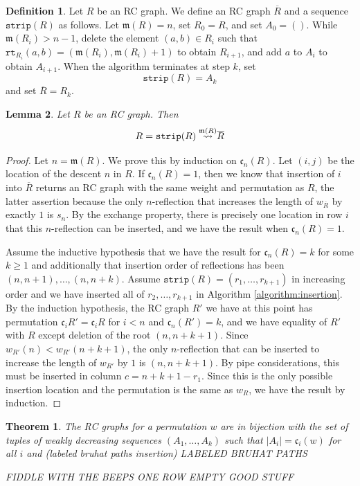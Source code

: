 \documentclass{amsart}
\newtheorem{lemma}{Lemma}[subsection]
\newtheorem{theorem}{Theorem}[section]
\theoremstyle{definition}
\newtheorem{definition}[lemma]{Definition}
\theoremstyle{remark}
\numberwithin{equation}{subsection}
\newcommand{\wof}[1]{w_{#1}}
\newcommand{\rtt}{\mathtt{rt}}
\newcommand{\code}{\mathfrak{c}}
\newcommand{\maxd}{\mathfrak{m}}
\begin{document}
\begin{definition}
Let $R$ be an RC graph. We define an RC graph $\overline{R}$ and a sequence $\mathtt{strip}(R)$ as follows. Let $\maxd(R)=n$, set $R_0=R$, and set $A_0=()$. While $\maxd(R_i)> n -1$, delete the element $(a,b)\in R_i$ such that $\rtt_{R_i}(a,b)=(\maxd(R_i), \maxd(R_i) + 1)$ to obtain $R_{i+1}$, and add $a$ to $A_i$ to obtain $A_{i+1}$. When the algorithm terminates at step $k$, set
$$\mathtt{strip}(R) = A_k$$
and set $\overline{R} = R_k$.
\end{definition}

\begin{lemma} \label{lemma:reconstruct}
Let $R$ be an RC graph. Then
$$R = \ins{\maxd(R)}{\mathtt{strip}(R)} \overline{R}$$
\end{lemma}
\begin{proof}
Let $n=\maxd(R)$. We prove this by induction on $\code_n(R)$. Let $(i,j)$ be the location of the descent $n$ in $R$. If $\code_n(R)=1$, then we know that insertion of $i$ into $\overline{R}$ returns an RC graph with the same weight and permutation as $R$, the latter assertion because the only $n$-reflection that increases the length of $\wof{\overline{R}}$ by exactly $1$ is $s_n$. By the exchange property, there is precisely one location in row $i$ that this $n$-reflection can be inserted, and we have the result when $\code_{n}(R)=1$.

Assume the inductive hypothesis that we have the result for $\code_n(R) = k$ for some $k\geq 1$ and additionally that insertion order of reflections has been $(n, n+1),\ldots,(n,n+k)$. Assume $\mathtt{strip}(R) = (r_1,\ldots,r_{k+1})$ in increasing order and we have inserted all of $r_2,\ldots,r_{k+1}$ in Algorithm \ref{algorithm:insertion}. By the induction hypothesis, the RC graph $R'$ we have at this point has permutation $\code_i{R'} = \code_i{R}$ for $i<n$ and $\code_n(R') = k$, and we have equality of $R'$ with $R$ except deletion of the root $(n, n+k + 1)$. Since $\wof{R'}(n) < \wof{R'}(n+k+1)$, the only $n$-reflection that can be inserted to increase the length of $\wof{R'}$ by $1$ is $(n, n+k+1)$. By pipe considerations, this must be inserted in column $c = n + k + 1 - r_1$. Since this is the only possible insertion location and the permutation is the same as $\wof{R}$, we have the result by induction.
\end{proof}

\begin{theorem}
The RC graphs for a permutation $w$ are in bijection with the set of tuples of weakly decreasing sequences $(A_1,\ldots,A_k)$ such that $|A_i| = \code_i(w)$ for all $i$ and (labeled bruhat paths insertion)
LABELED BRUHAT PATHS

FIDDLE WITH THE BEEPS ONE ROW EMPTY GOOD STUFF
\end{theorem}
\end{document}
